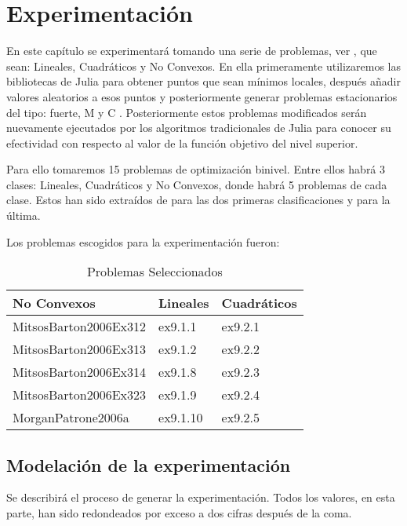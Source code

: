 
\chapter{Experimentación}
En este capítulo se experimentará tomando una serie de problemas, ver \cite{BolibTestProblems}, 
que sean: Lineales, Cuadráticos y No Convexos. En ella primeramente utilizaremos las bibliotecas de Julia
para obtener puntos que sean mínimos locales, después añadir valores aleatorios a esos puntos y posteriormente 
generar problemas estacionarios del tipo: fuerte, M y C . Posteriormente estos problemas modificados serán nuevamente
ejecutados por los algoritmos tradicionales de Julia para conocer su efectividad con respecto al valor de la función objetivo del nivel superior.


Para ello tomaremos 15 problemas de optimización binivel.
Entre ellos habrá 3 clases: Lineales, Cuadráticos y No Convexos, donde habrá 5 problemas de cada clase.
Estos han sido extraídos de \cite{Floudas1999HandbookOT} para las dos primeras clasificaciones y \cite{BolibTestProblems} para la última.

\newpage
Los problemas escogidos para la experimentación fueron:

\begin{table}[h!]
\centering
\caption{Problemas Seleccionados}
\begin{tabular}{ | m{5cm} | m{5cm} | m{5cm} | }
  
  \hline
  \textbf{No Convexos} & \textbf{Lineales} & \textbf{Cuadráticos} \\
  \hline
  MitsosBarton2006Ex312 & ex9.1.1 & ex9.2.1 \\
  \hline
  MitsosBarton2006Ex313 & ex9.1.2 & ex9.2.2 \\
  \hline
  MitsosBarton2006Ex314 & ex9.1.8 & ex9.2.3\\
  \hline
  MitsosBarton2006Ex323 & ex9.1.9 & ex9.2.4\\
  \hline
  MorganPatrone2006a & ex9.1.10 & ex9.2.5 \\
  \hline
\end{tabular}
\end{table}



\newpage
\section{Modelación de la experimentación}
Se describirá el proceso de generar la experimentación. 
Todos los valores, en esta parte, han sido redondeados por exceso a dos cifras después de la coma. 

